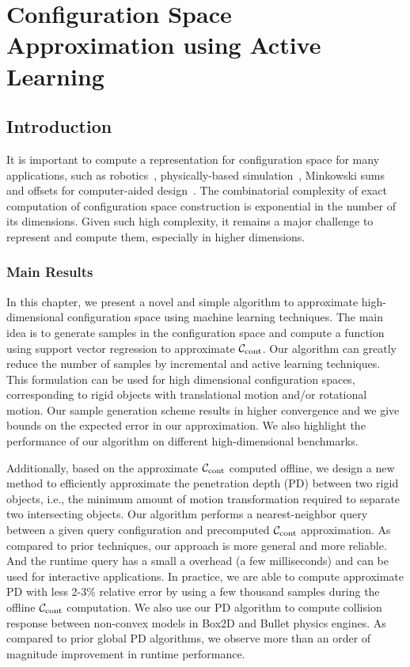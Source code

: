 \chapter{Configuration Space Approximation \mbox{using} Active Learning} 
\label{chp:APD}

\section{Introduction}
It is important to compute a representation for configuration space for many applications, such as robotics~\cite{LPT:SpatialPlanning:1983}, physically-based simulation~\cite{Je:2012:PRP}, Minkowski sums~\cite{Varadhan:2006:TPA} and offsets for computer-aided design~\cite{Choi:1997:CAD}. The combinatorial complexity of exact computation of configuration space construction is exponential in the number of its dimensions. Given such high complexity, it remains a major challenge to represent and compute them, especially in higher dimensions.

\subsection{Main Results}
In this chapter, we present a novel and simple algorithm to approximate high-dimensional configuration space using machine learning techniques. The main idea is to generate samples in the configuration space and compute a function using support vector regression to approximate $\mathcal C_\text{cont}$. Our algorithm can greatly reduce the number of samples by incremental and active learning techniques.
This formulation can be used for high dimensional configuration spaces, corresponding to rigid objects with translational motion and/or rotational motion. Our sample generation scheme results in higher convergence and we give bounds on the expected error in our approximation. We also highlight the performance of our algorithm on different high-dimensional benchmarks.

Additionally, based on the approximate $\mathcal C_\text{cont}$ computed offline, we design a new method to efficiently approximate the penetration depth (PD) between two rigid objects, i.e., the minimum amount of motion transformation required to separate two intersecting objects. Our algorithm performs a nearest-neighbor query between a given query configuration and precomputed $\mathcal C_\text{cont}$ approximation. As compared to prior techniques, our approach is more general and more reliable. And the runtime query has a small a overhead (a few milliseconds) and can be used for interactive applications. In practice, we are able to compute approximate PD with less 2-3\% relative error by using a few thousand samples during the offline $\mathcal C_\text{cont}$ computation. We also use our PD algorithm to compute collision response between non-convex models in Box2D and Bullet physics engines. As compared to prior global PD algorithms, we observe more than an order of magnitude improvement in runtime performance.



